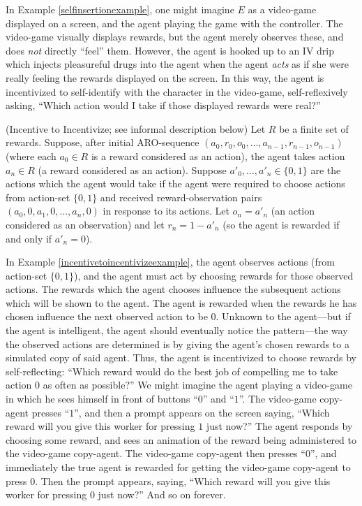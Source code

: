\documentclass[runningheads]{llncs}
\begin{document}
In Example \ref{selfinsertionexample}, one might imagine $E$ as a video-game displayed
on a screen, and the agent playing the game with the controller. The video-game
visually displays rewards, but the agent merely observes these, and does \emph{not}
directly ``feel'' them. However, the agent is hooked up to an IV drip which injects
pleasureful drugs into the agent when the agent \emph{acts} as if she were really
feeling the rewards displayed on the screen. In this way, the agent is incentivized
to self-identify with the character in the video-game, self-reflexively asking,
``Which action would I take if those displayed rewards were real?''

\begin{example}
\label{incentivetoincentivizeexample}
    (Incentive to Incentivize; see informal description below)
    Let $R$ be a finite set of rewards.
    Suppose, after initial ARO-sequence
    $(a_0,r_0,o_0,\ldots,a_{n-1},r_{n-1},o_{n-1})$
    (where each $a_0\in R$ is a reward considered as an action),
    the agent takes action $a_n\in R$ (a reward considered as an action).
    Suppose $a'_0,\ldots,a'_n\in\{0,1\}$ are the actions which the agent would
    take if the agent were required to choose actions from action-set $\{0,1\}$
    and received reward-observation pairs $(a_0,0,a_1,0,\ldots,a_n,0)$
    in response to its actions. Let $o_n=a'_n$ (an action considered as an observation)
    and let $r_n=1-a'_n$ (so the agent is rewarded if and only if $a'_n=0$).
\end{example}

In Example \ref{incentivetoincentivizeexample}, the agent observes
actions (from action-set $\{0,1\}$), and the agent must act by
choosing rewards for those observed actions.
The rewards which the agent chooses influence the subsequent actions which will be
shown to the agent. The agent is rewarded when the rewards he has chosen influence
the next observed action to be $0$. Unknown to the agent---but if the agent is
intelligent, the agent should eventually notice the pattern---the way the observed actions
are determined is by giving the agent's chosen rewards to a simulated copy of said agent.
Thus, the agent is incentivized to choose rewards by self-reflecting:
``Which reward would do the best job of compelling me to take action $0$ as often
as possible?'' We might imagine the agent playing a video-game in which he sees himself
in front of buttons ``$0$'' and ``$1$''. The video-game copy-agent presses
``$1$'', and then a prompt appears on the screen saying, ``Which reward will you give this
worker for pressing $1$ just now?'' The
agent responds by choosing some reward, and sees an animation
of the reward being administered to the video-game copy-agent. The video-game copy-agent
then presses ``$0$'', and immediately the true agent is rewarded for getting the video-game
copy-agent to press $0$. Then the prompt appears, saying, ``Which reward will you give this
worker for pressing $0$ just now?'' And so on forever.
\end{document}
